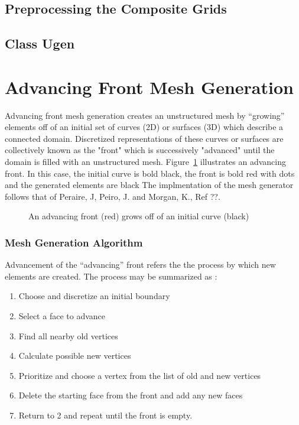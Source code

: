 \documentclass{article}
\begin{document}
\subsection{Preprocessing the Composite Grids}
\subsection{Class Ugen}


\section{Advancing Front Mesh Generation}
Advancing front mesh generation creates an unstructured mesh by ``growing'' 
elements off of an initial set of curves (2D) or surfaces (3D) which describe a connected domain.
Discretized representations of these curves or surfaces are collectively
known as the "front" which is successively "advanced" until the domain
is filled with an unstructured mesh.  Figure~\ref{fig:advfront} illustrates an advancing front. 
In this case, the initial curve is bold black,
the front is bold red with dots and the generated elements are black
The implmentation of the mesh generator follows that of Peraire, J, Peiro, J. and Morgan, K., Ref ??.
\begin{figure}
 \begin{center}
  \caption{An advancing front (red) grows off of an initial curve (black)}\label{fig:advfront}
  \end{center}
\end{figure}

\subsubsection{Mesh Generation Algorithm}
Advancement of the ``advancing'' front refers
the the process by which new elements are created.  The process may be summarized as :
\begin{enumerate}
\item Choose and discretize an initial boundary
\item Select a face to advance
\item Find all nearby old vertices
\item Calculate possible new vertices
\item Prioritize and choose a vertex from the list of old and new vertices
\item Delete the starting face from the front and add any new faces
\item Return to 2 and repeat until the front is empty.
\end{enumerate}
\end{document}
